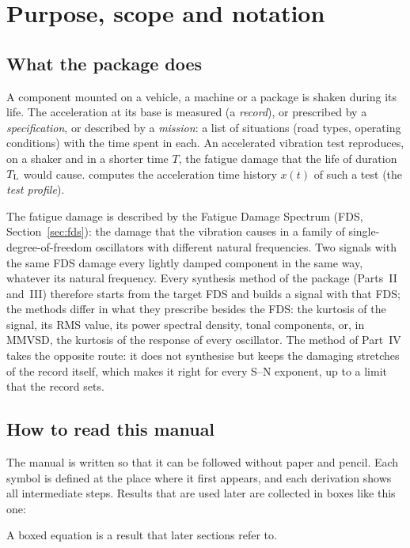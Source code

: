\section{Purpose, scope and notation}\label{sec:intro}

\subsection{What the package does}

A component mounted on a vehicle, a machine or a package is shaken during its life. The acceleration
at its base is measured (a \emph{record}), or prescribed by a \emph{specification}, or described by a
\emph{mission}: a list of situations (road types, operating conditions) with the time spent in each.
An accelerated vibration test reproduces, on a shaker and in a shorter time $T$, the fatigue damage
that the life of duration $T_{\mathrm{L}}$ would cause.  computes the acceleration time history
$x(t)$ of such a test (the \emph{test profile}).

The fatigue damage is described by the Fatigue Damage Spectrum (FDS, Section~\ref{sec:fds}): the
damage that the vibration causes in a family of single-degree-of-freedom oscillators with different
natural frequencies. Two signals with the same FDS damage every lightly damped component in the same
way, whatever its natural frequency. Every synthesis method of the package (Parts~II and~III)
therefore starts from the target FDS and builds a signal with that FDS; the methods differ in what
they prescribe besides the FDS: the kurtosis of the signal, its RMS value, its power spectral density,
tonal components, or, in MMVSD, the kurtosis of the response of every oscillator. The 
method of Part~IV takes the opposite route: it does not synthesise but keeps the damaging stretches of
the record itself, which makes it right for every S--N exponent, up to a limit that the record sets.

\subsection{How to read this manual}

The manual is written so that it can be followed without paper and pencil. Each symbol is defined at
the place where it first appears, and each derivation shows all intermediate steps. Results that are
used later are collected in boxes like this one:

\begin{result}
A boxed equation is a result that later sections refer to.
\end{result}


